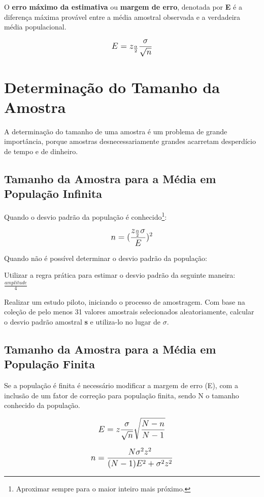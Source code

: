 O \textbf{erro máximo da estimativa} ou \textbf{margem de erro}, denotada por \textbf{E} é a diferença máxima provável entre a média amostral observada e a verdadeira média populacional.

\[\beq{ E = z_\frac{\alpha}{2}\frac{\sigma}{\sqrt{n}} }\]

\section{Determinação do Tamanho da Amostra}

A determinação do tamanho de uma amostra é um problema de grande importância, porque amostras desnecessariamente grandes acarretam desperdício de tempo e de dinheiro.

\subsection{Tamanho da Amostra para a Média em População Infinita}

Quando o desvio padrão da população é conhecido\footnote{Aproximar sempre para o maior inteiro mais próximo.}:

\[\beq{ n = (\frac{z_\frac{\alpha}{2}\sigma}{E})^2 }\]

Quando não é possível determinar o desvio padrão da população:
\begin{alineas}
	\item Utilizar a regra prática para estimar o desvio padrão da seguinte maneira: \( \frac{amplitude}{4} \)
	\item Realizar um estudo piloto, iniciando o processo de amostragem. Com base na coleção de pelo menos 31 valores amostrais selecionados aleatoriamente, calcular o desvio padrão amostral \textbf{s} e utiliza-lo no lugar de \(\sigma\).
\end{alineas}

\subsection{Tamanho da Amostra para a Média em População Finita}

Se a população é finita é necessário modificar a margem de erro (E), com a inclusão de um fator de correção para população finita, sendo N o tamanho conhecido da população.

\[\beq{ E = z\frac{\sigma}{\sqrt{n}}\sqrt{\frac{N-n}{N-1}} }\]

\[\beq{ n = \frac{N\sigma^2z^2}{(N-1)E^2+\sigma^2z^2} }\]

